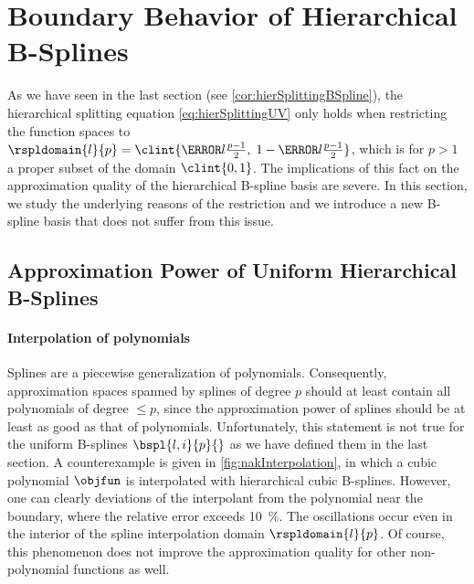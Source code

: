 \section{Boundary Behavior of Hierarchical B-Splines}
\label{sec:32notAKnot}

As we have seen in the last section (see \cref{cor:hierSplittingBSpline}),
the hierarchical splitting equation \eqref{eq:hierSplittingUV}
only holds when restricting the function spaces to
$\rspldomain{l}{p} = \clint{\ms{l} \tfrac{p-1}{2},\; 1 - \ms{l} \tfrac{p-1}{2}}$,
which is for $p > 1$ a proper subset of the domain $\clint{0, 1}$.
The implications of this fact on the approximation quality
of the hierarchical B-spline basis are severe.
In this section, we study the underlying reasons of the restriction and
we introduce a new B-spline basis that does not suffer from this issue.



\subsection{Approximation Power of Uniform Hierarchical B-Splines}
\label{sec:321approximation}


\paragraph{Interpolation of polynomials}

Splines are a piecewise generalization of polynomials.
Consequently, approximation spaces spanned by splines of degree $p$ should
at least contain all polynomials of degree $\le p$,
since the approximation power of splines should be at least as good
as that of polynomials.
Unfortunately, this statement is not true for the uniform B-splines
$\bspl{l,i}{p}{}$ as we have defined them in the last section.
A counterexample is given in \cref{fig:nakInterpolation},
in which a cubic polynomial $\objfun$ is interpolated with
hierarchical cubic B-splines.
However, one can clearly deviations of the interpolant from the polynomial
near the boundary, where the relative error exceeds \SI{10}{\percent}.
The oscillations occur even in the interior of the
spline interpolation domain $\rspldomain{l}{p}$.
Of course, this phenomenon does not improve the approximation quality
for other non-polynomial functions as well.

